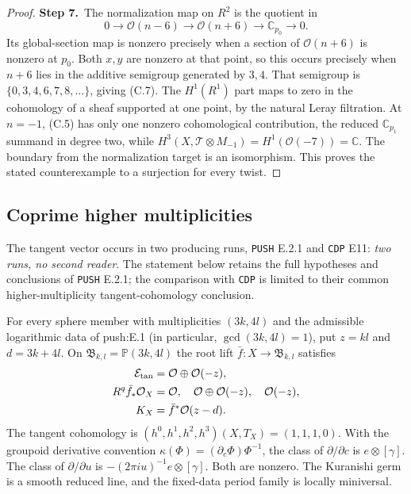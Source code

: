 \begin{proof}
\par\smallskip\noindent\textbf{Step 7.}\ The normalization map on $R^2$ is the quotient in
\[
0\longrightarrow\mathcal O(n-6)\longrightarrow\mathcal O(n+6)
 \longrightarrow\mathbb C_{p_0}\longrightarrow0.
\]
Its global-section map is nonzero precisely when a section of $\mathcal O(n+6)$ is nonzero at $p_0$. Both $x,y$ are nonzero at that point, so this occurs precisely when $n+6$ lies in the additive semigroup generated by $3,4$. That semigroup is $\{0,3,4,6,7,8,\ldots\}$, giving (C.7). The $H^1(R^1)$ part maps to zero in the cohomology of a sheaf supported at one point, by the natural Leray filtration. At $n=-1$, (C.5) has only one nonzero cohomological contribution, the reduced $\mathbb C_{p_1}$ summand in degree two, while $H^3(X,\mathcal T\otimes M_{-1})=H^1(\mathcal O(-7))=\mathbb C$. The boundary from the normalization target is an isomorphism. This proves the stated counterexample to a surjection for every twist.
\end{proof}

\subsection{Coprime higher multiplicities}\label{sec:tangent-higher}
The tangent vector occurs in two producing runs, \texttt{PUSH} E.2.1
and \texttt{CDP} E11: \emph{two runs, no second reader}.
The statement below retains the full hypotheses and conclusions of
\texttt{PUSH} E.2.1; the comparison with \texttt{CDP} is limited to
their common higher-multiplicity tangent-cohomology conclusion.


\begin{theorem}\label{push:E.2.1}
For every sphere member with multiplicities $(3k,4l)$ and the
admissible logarithmic data of push:E.1 (in particular, $\gcd(3k,4l)=1$), put $z=kl$ and $d=3k+4l$.
On $\mathfrak B_{k,l}=\mathbb P(3k,4l)$ the root lift
$\bar f:X\to\mathfrak B_{k,l}$ satisfies
\[
 \begin{split}
 \mathcal E_{\rm tan}&=\mathcal O\oplus\mathcal O(-z),\\
 R^q\bar f_*\mathcal O_X&=
 \mathcal O,\quad\mathcal O\oplus\mathcal O(-z),\quad\mathcal O(-z),\\
 K_X&=\bar f^*\mathcal O(z-d).
 \end{split}
\]
The tangent cohomology is $(h^0,h^1,h^2,h^3)(X,T_X)=(1,1,1,0)$.
With the groupoid derivative convention
$\kappa(\Phi)=(\partial_c\Phi)\Phi^{-1}$, the class of
$\partial/\partial c$ is $e\otimes[\gamma]$.  The class of
$\partial/\partial u$ is
$-(2\pi i u)^{-1}e\otimes[\gamma]$.  Both are nonzero.
The Kuranishi germ is a smooth reduced line, and the fixed-data
period family is locally miniversal.
\end{theorem}

